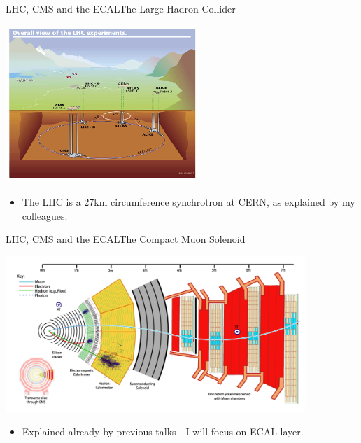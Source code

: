 \documentclass{beamer}
\begin{document}
\begin{frame}{LHC, CMS and the ECAL}{The Large Hadron Collider}
\begin{center}
\includegraphics[width=0.55\textwidth]{"LHC"}
\end{center}
  \begin{itemize}
\vfill \item {\footnotesize The LHC is a 27km circumference synchrotron at CERN, as explained by my colleagues.}
  \end{itemize}
\end{frame}
\begin{frame}{LHC, CMS and the ECAL}{The Compact Muon Solenoid}
\begin{center}
\includegraphics[width=0.85\textwidth]{"CMSLayout"}
\end{center}
  \begin{itemize}
\vfill \item {\footnotesize Explained already by previous talks - I will focus on ECAL layer.\\}
  \end{itemize}
\end{frame}
\end{document}
